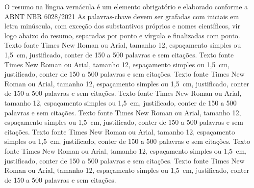 O resumo na língua vernácula é um elemento obrigatório e elaborado conforme a
ABNT NBR 6028/2021 As palavras-chave devem ser grafadas com iniciais em letra
minúscula, com exceção dos substantivos próprios e nomes científicos, vir logo
abaixo do resumo, separadas por ponto e vírgula e finalizadas com ponto. Texto
fonte Times New Roman ou Arial, tamanho 12, espaçamento simples ou 1,5~cm,
justificado, conter de 150 a 500 palavras e sem citações. Texto fonte Times
New Roman ou Arial, tamanho 12, espaçamento simples ou 1,5~cm, justificado,
conter de 150 a 500 palavras e sem citações. Texto fonte Times New Roman ou
Arial, tamanho 12, espaçamento simples ou 1,5~cm, justificado, conter de 150 a
500 palavras e sem citações. Texto fonte Times New Roman ou Arial, tamanho 12,
espaçamento simples ou 1,5~cm, justificado, conter de 150 a 500 palavras e sem
citações. Texto fonte Times New Roman ou Arial, tamanho 12, espaçamento
simples ou 1,5~cm, justificado, conter de 150 a 500 palavras e sem citações.
Texto fonte Times New Roman ou Arial, tamanho 12, espaçamento simples ou
1,5~cm, justificado, conter de 150 a 500 palavras e sem citações. Texto fonte
Times New Roman ou Arial, tamanho 12, espaçamento simples ou 1,5~cm,
justificado, conter de 150 a 500 palavras e sem citações. Texto fonte Times
New Roman ou Arial, tamanho 12, espaçamento simples ou 1,5~cm, justificado,
conter de 150 a 500 palavras e sem citações.





